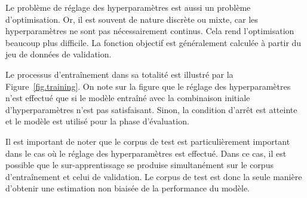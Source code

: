 Le problème de réglage des hyperparamètres est aussi un problème d'optimisation.
Or, il est souvent de nature discrète ou mixte, car les hyperparamètres ne sont pas nécessairement continus.
Cela rend l'optimisation beaucoup plus difficile.
La fonction objectif est généralement calculée à partir du jeu de données de validation.

Le processus d'entraînement dans sa totalité est illustré par la Figure~\ref{fig.training}.
On note sur la figure que le réglage des hyperparamètres n'est effectué 
que si le modèle entraîné avec la combinaison initiale d'hyperparamètres n'est pas satisfaisant.
Sinon, la condition d'arrêt est atteinte et le modèle est utilisé pour la phase d'évaluation.

Il est important de noter que le corpus de test est particulièrement important 
dans le cas où le réglage des hyperparamètres est effectué.
Dans ce cas, il est possible que le sur-apprentissage se produise simultanément 
sur le corpus d'entraînement et celui de validation.
Le corpus de test est donc la seule manière d'obtenir une estimation non biaisée de la performance du modèle.